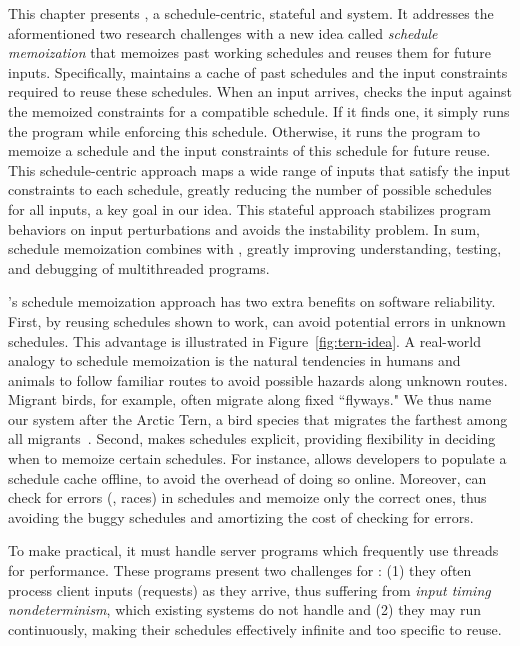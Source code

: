 This chapter presents \tern, a schedule-centric, stateful \smt and \dmt system. 
It addresses the aformentioned two research challenges with a new idea called
\emph{schedule memoization} that memoizes past working schedules and reuses them
for future inputs.  Specifically, \tern maintains a cache of past schedules and
the input constraints required to reuse these schedules.  When an input arrives,
\tern checks the input against the memoized constraints for a compatible
schedule.  If it finds one, it simply runs the program while enforcing
this schedule.  Otherwise, it runs the program to memoize a schedule and
the input constraints of this schedule for future reuse. This schedule-centric
approach maps a wide range of inputs that satisfy the input constraints to each
schedule, greatly reducing the number of possible schedules for all inputs, a
key goal in our \smt idea. This stateful approach stabilizes program behaviors
on input perturbations and avoids the instability problem. In sum, schedule
memoization combines \dmt with \smt, greatly improving understanding, testing,
and debugging of multithreaded programs.

\tern's schedule memoization approach has two extra benefits on software
reliability. First, by reusing schedules shown to work, \tern can avoid
potential errors in unknown schedules.  This advantage is illustrated in
Figure~\ref{fig:tern-idea}. A real-world analogy to schedule memoization is the
natural tendencies in humans and animals to follow familiar routes to avoid
possible hazards along unknown routes.  Migrant birds, for example, often
migrate along fixed ``flyways."  We thus name our system after the Arctic Tern,
a bird species that migrates the farthest among all
migrants~\cite{artic-tern-wiki}. Second, \tern makes schedules explicit,
providing flexibility in deciding when to memoize certain schedules.  For
instance, \tern allows developers to populate a schedule cache offline, to avoid
the overhead of doing so online.  Moreover, \tern can check for errors (\eg,
races) in schedules and memoize only the correct ones, thus avoiding the buggy
schedules and amortizing the cost of checking for errors.

To make \tern practical, it must handle server programs which frequently
use threads for performance.  These programs present two challenges for
\tern: (1) they often process client inputs (requests) as they arrive, thus
suffering from \emph{input timing nondeterminism}, which existing \dmt systems
do not handle and (2) they may run continuously, making their schedules
effectively infinite and too specific to reuse.


